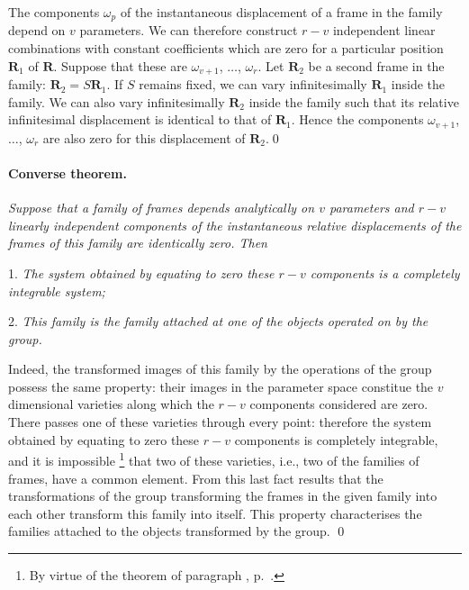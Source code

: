 \somespace

The components $\omega_{p}$ of the instantaneous displacement of a frame in the family depend on $v$ parameters. We can therefore construct $r-v$ independent linear combinations with constant coefficients which are zero for a particular position $\mathbf{R}_{1}$ of $\mathbf{R}$. Suppose that these are $\omega_{v+1}$, $\dots$, $\omega_{r}$. Let $\mathbf{R}_{2}$ be a second frame in the family: $\mathbf{R}_{2}=S\mathbf{R}_{1}$. If $S$ remains fixed, we can vary infinitesimally $\mathbf{R}_{1}$ inside the family.  We can also vary infinitesimally $\mathbf{R}_{2}$ inside the family such that its relative infinitesimal displacement is identical to that of $\mathbf{R}_{1}$. Hence the components $\omega_{v+1}$, $\dots$, $\omega_{r}$ are also zero for this displacement of $\mathbf{R}_{2}$.\qed

\paragraph{Converse theorem.}
\label{sec:124}
\emph{Suppose that a family of frames depends analytically on $v$ parameters and $r-v$ linearly independent components of the instantaneous relative displacements of the frames of this family are identically zero. Then}

\somespace

1. \emph{The system obtained by equating to zero these $r-v$ components is a completely integrable system;}

2. \emph{This family is the family attached at one of the objects operated on by the group.}

\somespace

Indeed, the transformed images of this family by the operations of the group possess the same property: their images in the parameter space constitue the $v$ dimensional varieties along which the $r-v$ components considered are zero. There passes one of these varieties through every point: therefore the system obtained by equating to zero these $r-v$ components is completely integrable, and it is impossible \footnote{By virtue of the theorem of paragraph , p.~\pageref{sec:81}.} that two of these varieties, i.e., two of the families of frames, have a common element. From this last fact results that the transformations of the group transforming the frames in the given family into each other transform this family into itself. This property characterises the families attached to the objects transformed by the group. \qed

